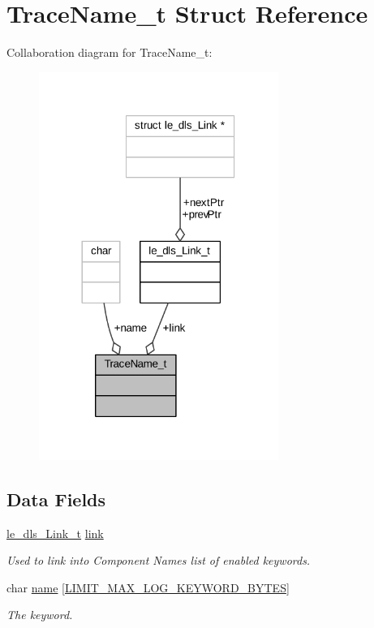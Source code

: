 \hypertarget{struct_trace_name__t}{}\section{Trace\+Name\+\_\+t Struct Reference}
\label{struct_trace_name__t}


Collaboration diagram for Trace\+Name\+\_\+t\+:
\nopagebreak
\begin{figure}[H]
\begin{center}
\leavevmode
\includegraphics[width=221pt]{struct_trace_name__t__coll__graph}
\end{center}
\end{figure}
\subsection*{Data Fields}
\begin{DoxyCompactItemize}
\item 
\hyperlink{structle__dls___link__t}{le\+\_\+dls\+\_\+\+Link\+\_\+t} \hyperlink{struct_trace_name__t_a37288b01e721122d56e64f0c43992f07}{link}
\begin{DoxyCompactList}\small\item\em Used to link into Component Name\textquotesingle{}s list of enabled keywords. \end{DoxyCompactList}\item 
char \hyperlink{struct_trace_name__t_a283445caccf888b745e251f73043c844}{name} \mbox{[}\hyperlink{limit_8h_a295c601381a60220239f4c26403a59cb}{L\+I\+M\+I\+T\+\_\+\+M\+A\+X\+\_\+\+L\+O\+G\+\_\+\+K\+E\+Y\+W\+O\+R\+D\+\_\+\+B\+Y\+T\+ES}\mbox{]}
\begin{DoxyCompactList}\small\item\em The keyword. \end{DoxyCompactList}\end{DoxyCompactItemize}


